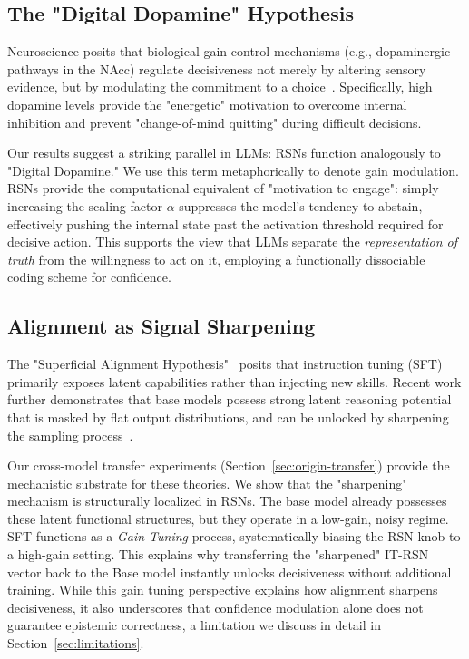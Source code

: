 \documentclass{article}
\begin{document}
\subsection{The "Digital Dopamine" Hypothesis}
Neuroscience posits that biological gain control mechanisms (e.g., dopaminergic pathways in the NAcc) regulate decisiveness not merely by altering sensory evidence, but by modulating the commitment to a choice~\cite{paper4_dopamine}. Specifically, high dopamine levels provide the "energetic" motivation to overcome internal inhibition and prevent "change-of-mind quitting" during difficult decisions.

Our results suggest a striking parallel in LLMs: RSNs function analogously to "Digital Dopamine." We use this term metaphorically to denote gain modulation. RSNs provide the computational equivalent of "motivation to engage": simply increasing the scaling factor $\alpha$ suppresses the model's tendency to abstain, effectively pushing the internal state past the activation threshold required for decisive action. This supports the view that LLMs separate the \emph{representation of truth} from the willingness to act on it, employing a functionally dissociable coding scheme for confidence.

\subsection{Alignment as Signal Sharpening}
The "Superficial Alignment Hypothesis"~\cite{zhou2023lima} posits that instruction tuning (SFT) primarily exposes latent capabilities rather than injecting new skills. Recent work further demonstrates that base models possess strong latent reasoning potential that is masked by flat output distributions, and can be unlocked by sharpening the sampling process~\cite{paper9_reasoning_sampling}.

Our cross-model transfer experiments (Section~\ref{sec:origin-transfer}) provide the mechanistic substrate for these theories. We show that the "sharpening" mechanism is structurally localized in RSNs. The base model already possesses these latent functional structures, but they operate in a low-gain, noisy regime. SFT functions as a \emph{Gain Tuning} process, systematically biasing the RSN knob to a high-gain setting. This explains why transferring the "sharpened" IT-RSN vector back to the Base model instantly unlocks decisiveness without additional training. While this gain tuning perspective explains how alignment sharpens decisiveness, it also underscores that confidence modulation alone does not guarantee epistemic correctness, a limitation we discuss in detail in Section~\ref{sec:limitations}.
\end{document}
